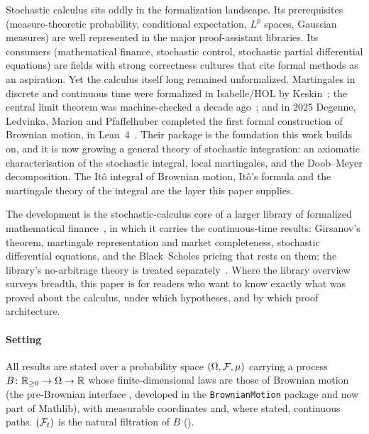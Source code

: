 \documentclass[11pt]{article}
\begin{document}
Stochastic calculus sits oddly in the formalization landscape. Its prerequisites (measure-theoretic
probability, conditional expectation, $L^p$ spaces, Gaussian measures) are well represented in the major
proof-assistant libraries. Its consumers (mathematical finance, stochastic control, stochastic partial
differential equations) are fields with strong correctness cultures that cite formal methods as an
aspiration. Yet the calculus itself long remained unformalized. Martingales in discrete and continuous
time were formalized in Isabelle/HOL by Keskin~\cite{Keskin2023}; the central limit theorem was
machine-checked a decade ago~\cite{AvigadHolzlSerafin2017}; and in 2025 Degenne, Ledvinka, Marion and
Pfaffelhuber completed the first formal construction of Brownian motion, in
Lean~4~\cite{DegenneEtAl2025,BrownianMotionRepo}. Their package is the foundation this work builds on,
and it is now growing a general theory of stochastic integration: an axiomatic characterisation of the
stochastic integral, local martingales, and the Doob--Meyer decomposition. The It\^o integral of
Brownian motion, It\^o's formula and the martingale theory of the integral are the layer this paper
supplies.

The development is the stochastic-calculus core of a larger library of formalized mathematical
finance~\cite{CoelhoLibrary}, in which it carries the continuous-time results: Girsanov's theorem,
martingale representation and market completeness, stochastic differential equations, and the
Black--Scholes pricing that rests on them; the library's no-arbitrage theory is treated
separately~\cite{CoelhoFTAP}. Where the library overview surveys breadth, this paper is for readers who
want to know exactly what was proved about the calculus, under which hypotheses, and by which proof
architecture.

\paragraph{Setting}
All results are stated over a probability space $(\Omega,\mathcal{F},\mu)$ carrying a process
$B\colon\mathbb{R}_{\ge0}\to\Omega\to\mathbb{R}$ whose finite-dimensional laws are those of Brownian motion (the
pre-Brownian interface , developed in the \texttt{BrownianMotion} package and now
part of Mathlib), with measurable coordinates and, where stated, continuous paths. $(\mathcal{F}_t)$ is the natural filtration of $B$
().
\end{document}
